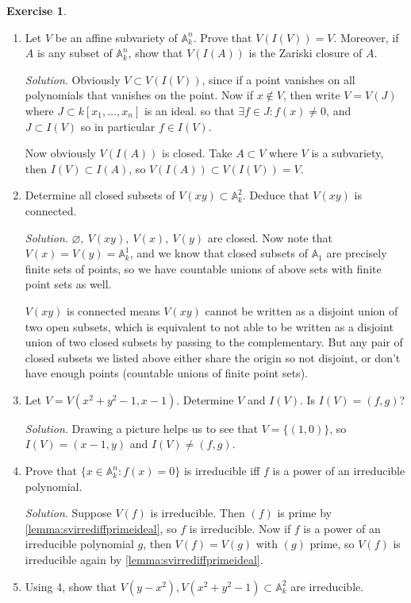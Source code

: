\documentclass{article}
\newcommand{\A}{\mathbb{A}}
\theoremstyle{definition}
\newtheorem{exe}[defn]{Exercise}
\begin{document}
\begin{exe}
\begin{enumerate}
\item Let $V$ be an affine subvariety of $\A_k^n$. Prove that $V(I(V))=V$. Moreover, if $A$ is any subset of $\A_k^n$, show that $V(I(A))$ is the Zariski closure of $A$.

\textit{Solution}. Obviously $V\subset V(I(V))$, since if a point vanishes on all polynomials that vanishes on the point. Now if $x\notin V$, then write $V=V(J)$ where $J\subset k[x_1,\ldots,x_n]$ is an ideal. so that $\exists f\in J:f(x)\neq 0$, and $J\subset I(V)$ so in particular $f\in I(V)$.

Now obviously $V(I(A))$ is closed. Take $A\subset V$ where $V$ is a subvariety, then $I(V)\subset I(A)$, so $V(I(A))\subset V(I(V))=V$.

\item Determine all closed subsets of $V(xy)\subset\A_k^2$. Deduce that $V(xy)$ is connected.

\textit{Solution}. $\varnothing,\ V(xy),\ V(x),\ V(y)$ are closed. Now note that $V(x)=V(y)=\A_k^1$, and we know that closed subsets of $\A_1$ are precisely finite sets of points, so we have countable unions of above sets with finite point sets as well.

$V(xy)$ is connected means $V(xy)$ cannot be written as a disjoint union of two open subsets, which is equivalent to not able to be written as a disjoint union of two closed subsets by passing to the complementary. But any pair of closed subsets we listed above either share the origin so not disjoint, or don't have enough points (countable unions of finite point sets).

\item Let $V=V(x^2+y^2-1,x-1)$. Determine $V$ and $I(V)$. Is $I(V)=(f,g)$?

\textit{Solution}. Drawing a picture helps us to see that $V=\{(1,0)\}$, so $I(V)=(x-1,y)$ and $I(V)\neq (f,g)$.

\item Prove that $\{x\in\A_k^n:f(x)=0\}$ is irreducible iff $f$ is a power of an irreducible polynomial.

\textit{Solution}. Suppose $V(f)$ is irreducible. Then $(f)$ is prime by \ref{lemma:svirrediffprimeideal}, so $f$ is irreducible. Now if $f$ is a power of an irreducible polynomial $g$, then $V(f)=V(g)$ with $(g)$ prime, so $V(f)$ is irreducible again by \ref{lemma:svirrediffprimeideal}.

\item Using 4, show that $V(y-x^2),V(x^2+y^2-1)\subset\A_k^2$ are irreducible.


\end{enumerate}
\end{exe}
\end{document}
